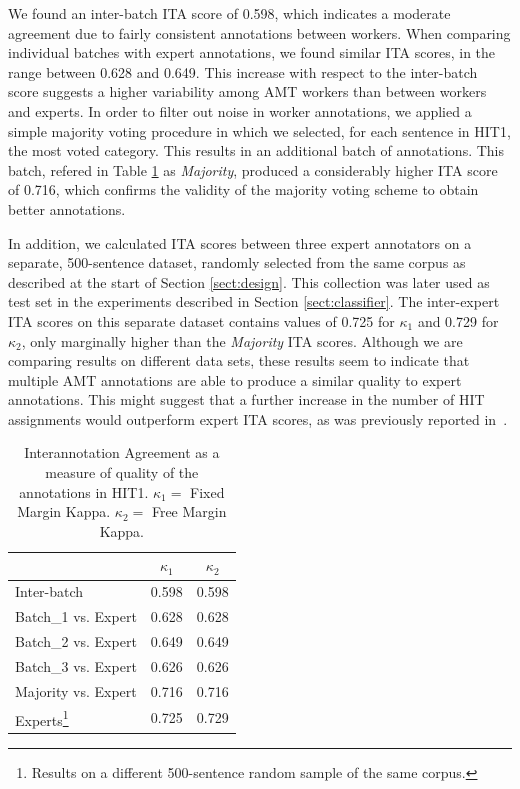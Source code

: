 \documentclass[11pt,letterpaper]{article}
\begin{document}
We found an inter-batch ITA score of 0.598, which indicates a moderate agreement due to fairly consistent annotations between workers. When comparing individual batches with expert annotations, we found similar ITA scores, in the range between 0.628 and 0.649. This increase with respect to the inter-batch score suggests a higher variability among AMT workers than between workers and experts. 
In order to filter out noise in worker annotations, we applied a simple majority voting procedure in which we selected, for each sentence in HIT1, the most voted category. This results in an additional batch of annotations. This batch, refered in Table \ref{table.ita} as \textit{Majority}, produced a considerably higher ITA score of 0.716, which confirms the validity of the majority voting scheme to obtain better annotations.

In addition, we calculated ITA scores between three expert annotators on a separate, 500-sentence dataset, randomly selected from the same corpus as described at the start of Section \ref{sect:design}. This collection was later used as test set in the experiments described in Section \ref{sect:classifier}. The inter-expert ITA scores on this separate dataset contains values of 0.725 for $\kappa_{1}$ and 0.729 for $\kappa_{2}$, only marginally higher than the \textit{Majority} ITA scores. Although we are comparing results on different data sets, these results seem to indicate that multiple AMT annotations are able to produce a similar quality to expert annotations. This might suggest that a further increase in the number of HIT assignments would outperform expert ITA scores, as was previously reported in~\cite{snow_cheap_2008}.

% 


\begin{table}[h]
\begin{center}
\begin{tabular}{|l|c|c|}
\hline
& $\kappa_{1}$ & $\kappa_{2}$ \\ 
\hline
Inter-batch & 0.598 & 0.598 \\ \hline
Batch\_1 vs. Expert & 0.628 & 0.628\\
Batch\_2 vs. Expert & 0.649 & 0.649\\
Batch\_3 vs. Expert & 0.626 & 0.626\\ \hline
Majority vs. Expert & 0.716 & 0.716\\ \hline
Experts\footnote{Results on a different 500-sentence random sample of the same corpus.} & 0.725 & 0.729\\ \hline
\end{tabular}
\end{center}
\label{table.ita}
\caption{Interannotation Agreement as a measure of quality of the annotations in HIT1. $\kappa_{1} = $ Fixed Margin Kappa. $\kappa_{2} = $ Free Margin Kappa.}
\end{table}
\end{document}

